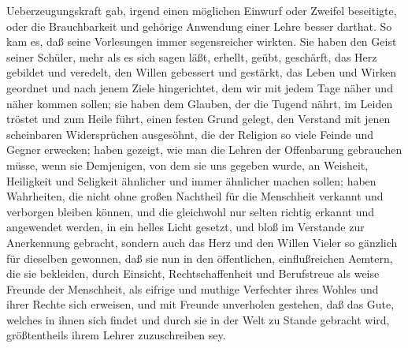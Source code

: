 Ueberzeugungskraft gab, irgend einen möglichen Einwurf oder Zweifel beseitigte, oder die Brauchbarkeit und gehörige Anwendung einer Lehre besser darthat. So kam es, daß seine Vorlesungen immer segensreicher wirkten. Sie haben den Geist seiner Schüler, mehr als es sich sagen läßt, erhellt, geübt, geschärft, das Herz gebildet und veredelt, den Willen gebessert und gestärkt, das Leben und Wirken geordnet und nach jenem Ziele hingerichtet, dem wir mit jedem Tage näher und näher kommen sollen; sie haben dem Glauben, der die Tugend nährt, im Leiden tröstet und zum Heile führt, einen festen Grund gelegt, den Verstand mit jenen scheinbaren Widersprüchen ausgesöhnt, die der Religion so viele Feinde und Gegner erwecken; haben gezeigt, wie man die Lehren der Offenbarung gebrauchen müsse, wenn sie Demjenigen, von dem sie uns gegeben wurde, an Weisheit, Heiligkeit und Seligkeit ähnlicher und immer ähnlicher machen sollen; haben Wahrheiten, die nicht ohne großen Nachtheil für die Menschheit verkannt und verborgen bleiben können, und die gleichwohl nur selten richtig erkannt und angewendet werden, in ein helles Licht gesetzt, und  bloß im Verstande zur Anerkennung gebracht, sondern auch das Herz und den Willen Vieler so gänzlich für dieselben gewonnen, daß sie nun in den öffentlichen, einflußreichen Aemtern, die sie bekleiden, durch Einsicht, Rechtschaffenheit und Berufstreue als weise Freunde der Menschheit, als eifrige und muthige Verfechter ihres Wohles und ihrer Rechte sich erweisen, und mit Freunde unverholen gestehen, daß das Gute, welches in ihnen sich findet und durch sie in der Welt zu Stande gebracht wird, größtentheils ihrem Lehrer zuzuschreiben sey.\par
